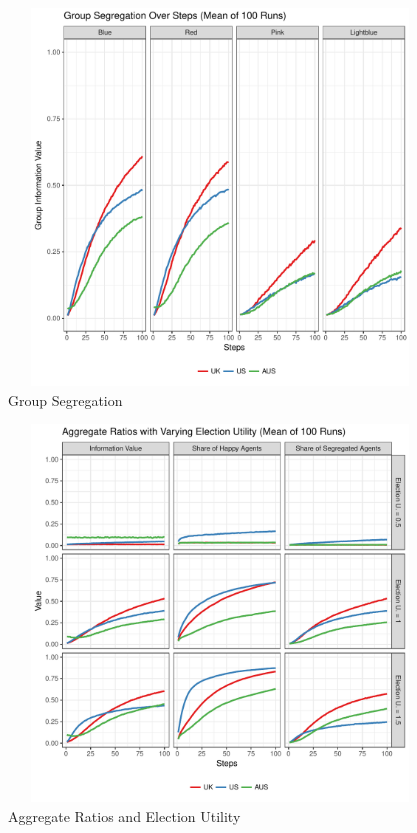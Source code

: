 \documentclass[12pt, a4paper]{article}
\begin{document}
\begin{figure}[bp!]
	\centering
	\caption{Group Segregation}
	\includegraphics[height=10cm,width=16cm]{./Plots/all_grp_ratios.pdf}
\end{figure}

\begin{figure}[bp!]
	\centering
	\caption{Aggregate Ratios and Election Utility}
	\includegraphics[height=10cm,width=16cm]{./Plots/all_el_agg_ratios.pdf}
\end{figure}
\end{document}
